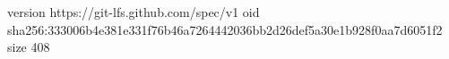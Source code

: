 version https://git-lfs.github.com/spec/v1
oid sha256:333006b4e381e331f76b46a7264442036bb2d26def5a30e1b928f0aa7d6051f2
size 408
